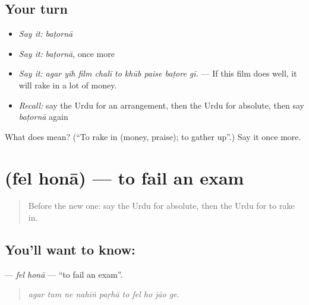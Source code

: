 \subsection*{Your turn}
\begin{itemize}
\raggedright
  \item \emph{Say it:} \emph{baṭornā}
  \item \emph{Say it:} \emph{baṭornā}, once more
  \item \emph{Say it:} \emph{agar yih film chalī to khūb paise baṭore gī.} — If this film does well, it will rake in a lot of money.
  \item \emph{Recall:} say the Urdu for an arrangement, then the Urdu for absolute, then say \emph{baṭornā} again
\end{itemize}

\begin{tcolorbox}[breakable,colback=teal!4,colframe=teal!35!black,title={Before you move on}]
What does  mean? (\textquotedblleft{}To rake in (money, praise); to gather up\textquotedblright{}.) Say it once more.
\end{tcolorbox}
\section[\texorpdfstring{\ur{فیل} \ur{ہونا} (fel honā)}{فیل ہونا (fel honā)}]{  (fel honā) — to fail an exam}

\label{lesson:UR-C383-fel-hona}



\begin{quote}
Before the new one: say the Urdu for absolute, then the Urdu for to rake in.
\end{quote}

\subsection*{You'll want to know:  }
\textbf{ } — \emph{fel honā} — \textquotedblleft{}to fail an exam\textquotedblright{}.

\begin{quote}
         
\end{quote}

\begin{quote}
\emph{agar tum ne nahīṅ paṛhā to fel ho jāo ge.}
\end{quote}

